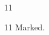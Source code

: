 \documentclass[paper=A4]{ropas-poster}
\begin{document}
\begin{postergrid}{1}{1}
\begin{posterblock}{1}{1}
Marked\footnotemark.
\end{posterblock}
\end{postergrid}
\end{document}
